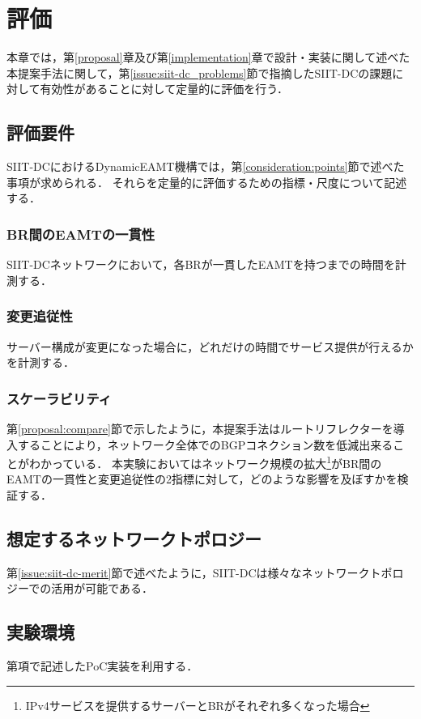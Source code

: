 \chapter{評価}
\label{evaluation}
本章では，第\ref{proposal}章及び第\ref{implementation}章で設計・実装に関して述べた本提案手法に関して，第\ref{issue:siit-dc_problems}節で指摘したSIIT-DCの課題に対して有効性があることに対して定量的に評価を行う．



\section{評価要件}
SIIT-DCにおけるDynamicEAMT機構では，第\ref{consideration:points}節で述べた事項が求められる．
それらを定量的に評価するための指標・尺度について記述する．


\subsection{BR間のEAMTの一貫性}
SIIT-DCネットワークにおいて，各BRが一貫したEAMTを持つまでの時間を計測する．

\subsection{変更追従性}
サーバー構成が変更になった場合に，どれだけの時間でサービス提供が行えるかを計測する．

\subsection{スケーラビリティ}
第\ref{proposal:compare}節で示したように，本提案手法はルートリフレクターを導入することにより，ネットワーク全体でのBGPコネクション数を低減出来ることがわかっている．
本実験においてはネットワーク規模の拡大\footnote{IPv4サービスを提供するサーバーとBRがそれぞれ多くなった場合}がBR間のEAMTの一貫性と変更追従性の2指標に対して，どのような影響を及ぼすかを検証する．



\section{想定するネットワークトポロジー}
第\ref{issue:siit-dc-merit}節で述べたように，SIIT-DCは様々なネットワークトポロジーでの活用が可能である．


\section{実験環境}
第\label{implementation:poc}項で記述したPoC実装を利用する．

